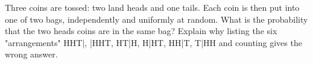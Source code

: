 Three coins are tossed: two land heads and one tails. Each coin is then put into one of two bags, independently and uniformly at random. What is the probability that the two heads coins are in the same bag? Explain why listing the six "arrangements" HHT|, |HHT, HT|H, H|HT, HH|T, T|HH and counting gives the wrong answer.
